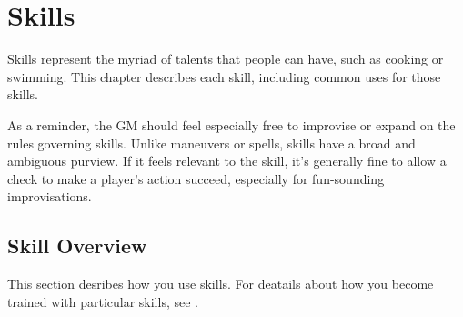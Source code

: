 \chapter{Skills}\label{Skills}

Skills represent the myriad of talents that people can have, such as cooking or swimming.
This chapter describes each skill, including common uses for those skills.

As a reminder, the GM should feel especially free to improvise or expand on the rules governing skills.
Unlike maneuvers or spells, skills have a broad and ambiguous purview.
If it feels relevant to the skill, it's generally fine to allow a check to make a player's action succeed, especially for fun-sounding improvisations.

\section{Skill Overview}
    This section desribes how you use skills.
    For deatails about how you become trained with particular skills, see .

